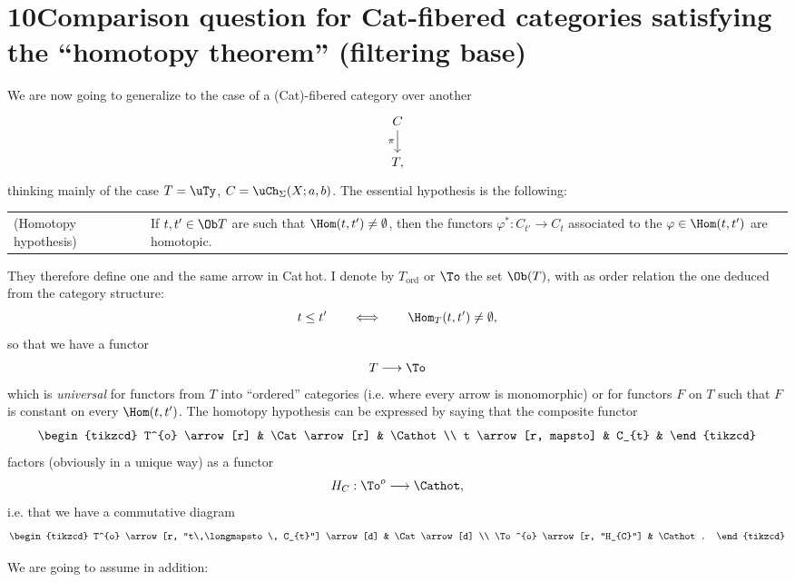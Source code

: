 \leavevmode{}

\section*{10\quad Comparison question for \textmd{Cat}-fibered categories satisfying the ``homotopy theorem'' (filtering base)}

We are now going to generalize to the case of a (Cat)-fibered category over another
\[
\begin{tikzcd}
C \arrow[d, "\pi"'] \\
T,
\end{tikzcd}
\]
thinking mainly of the case $T = \uTy$, $C = \uCh_{\Sigma}(X;a,b)$. The essential hypothesis is the following:

\noindent\begin{tabular}{@{}p{}p{}@{}}
(Homotopy hypothesis) & If $t,t' \in \Ob T$ are such that $\Hom(t,t') \neq \emptyset$, then the functors $\varphi^{*} : C_{t'} \longrightarrow C_{t}$ associated to the $\varphi \in \Hom(t,t')$ are homotopic.
\end{tabular}

They therefore define one and the same arrow in Cat\,hot. I denote by $T_{\mathrm{ord}}$ or $\To$ the set $\Ob(T)$, with as order relation the one deduced from the category structure:
\[
t \leq t' \qquad\Longleftrightarrow\qquad \Hom_{T}(t,t') \neq \emptyset,
\]
so that we have a functor
\[
T \longrightarrow \To
\]
which is \textit{universal} for functors from $T$ into ``ordered'' categories (i.e. where every arrow is monomorphic) or for functors $F$ on $T$ such that $F$ is constant on every $\Hom(t,t')$. The homotopy hypothesis can be expressed by saying that the composite functor
\[
\begin{tikzcd}
T^{o} \arrow[r] & \Cat \arrow[r] & \Cathot \\
t \arrow[r, mapsto] & C_{t} &
\end{tikzcd}
\]
factors (obviously in a unique way) as a functor
\[
H_{C} : \To^{o} \longrightarrow \Cathot,
\]
i.e. that we have a commutative diagram
\[
\begin{tikzcd}
T^{o} \arrow[r, "t\,\longmapsto\, C_{t}"] \arrow[d] & \Cat \arrow[d] \\
\To^{o} \arrow[r, "H_{C}"] & \Cathot.
\end{tikzcd}
\]

We are going to assume in addition:

